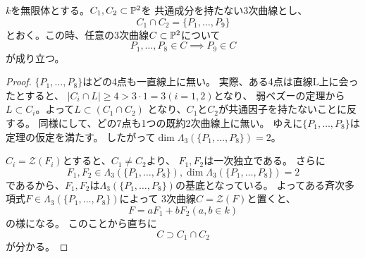 \documentclass[a4paper]{jsarticle}
\begin{document}
        \begin{Cor} \label{cor401}
            $k$を無限体とする。$C_1, C_2 \subset \mathbb{P}^2$を
            共通成分を持たない3次曲線とし、
             \[ C_1 \cap C_2 = \{ P_1, \dots, P_9 \} \]
             とおく。この時、任意の3次曲線$C \subset \mathbb{P}^2$について
             \[ P_1, \dots, P_8 \in C \implies P_9 \in C \]
             が成り立つ。
        \end{Cor}
        \begin{proof}
        $\{ P_1, \dots, P_8 \}$はどの4点も一直線上に無い。
        実際、ある4点は直線L上に会ったとすると、
        $|C_i \cap L| \geq 4 > 3 \cdot 1=3$$(i=1,2)$となり、
        弱ベズーの定理から$L \subset C_i$。よって$L \subset (C_1 \cap C_2)$
        となり、$C_1$と$C_2$が共通因子を持たないことに反する。
        同様にして、どの7点も1つの既約2次曲線上に無い。
        ゆえに$\{ P_1, \dots, P_8\}$は定理の仮定を満たす。
        したがって$\dim \Lambda_3(\{ P_1, \dots, P_8\})=2$。

        $C_i=\mathcal{Z}(F_i)$とすると、$C_1 \neq C_2$より、
        $F_1, F_2$は一次独立である。
        さらに
        \[ F_1, F_2 \in \Lambda_3(\{ P_1, \dots, P_8\}), \dim \Lambda_3(\{ P_1, \dots, P_8\})=2 \]
        であるから、$F_1, F_2$は$\Lambda_3(\{ P_1, \dots, P_8\})$の基底となっている。
        よってある斉次多項式$F \in \Lambda_3(\{ P_1, \dots, P_8\})$によって
        3次曲線$C=\mathcal{Z}(F)$と置くと、\[ F=aF_1+bF_2(a,b \in k) \]の様になる。
        このことから直ちに\[ C \supset C_1 \cap C_2 \]が分かる。
        \end{proof}
\end{document}
